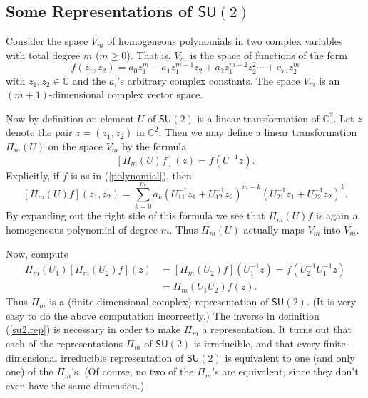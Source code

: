 \documentclass{amsbook}
\theoremstyle{plain}
\numberwithin{equation}{chapter}
\numberwithin{theorem}{chapter}
\begin{document}
\subsection{Some Representations of $\mathsf{SU}(2)$}

Consider the space $V_{m}$ of homogeneous polynomials in two complex variables
with total degree $m$ ($m\geq0$). That is, $V_{m}$ is the space of functions
of the form
\begin{equation}
f(z_{1},z_{2})=a_{0}z_{1}^{m}+a_{1}z_{1}^{m-1}z_{2}+a_{2}z_{1}^{m-2}z_{2}%
^{2}\cdots+a_{m}z_{2}^{m}\label{polynomial}%
\end{equation}
with $z_{1},z_{2}\in\mathbb{C}$ and the $a_{i}$'s arbitrary complex constants.
The space $V_{m}$ is an $(m+1)$-dimensional complex vector space.

Now by definition an element $U$ of $\mathsf{SU}(2)$ is a linear
transformation of $\mathbb{C}^{2}$. Let $z$ denote the pair $z=(z_{1},z_{2})$
in $\mathbb{C}^{2}$. Then we may define a linear transformation $\Pi_{m}(U)$
on the space $V_{m}$ by the formula
\begin{equation}
\left[  \Pi_{m}(U)f\right]  (z)=f(U^{-1}z)\text{.}\label{su2.rep}%
\end{equation}
Explicitly, if $f$ is as in (\ref{polynomial}), then
\[
\left[  \Pi_{m}(U)f\right]  (z_{1},z_{2})=\sum_{k=0}^{m}a_{k}\left(
U_{11}^{-1}z_{1}+U_{12}^{-1}z_{2}\right)  ^{m-k}\left(  U_{21}^{-1}%
z_{1}+U_{22}^{-1}z_{2}\right)  ^{k}\text{.}%
\]
By expanding out the right side of this formula we see that $\Pi_{m}(U)f$ is
again a homogeneous polynomial of degree $m$. Thus $\Pi_{m}(U)$ actually maps
$V_{m}$ into $V_{m}$.

Now, compute
\begin{align*}
\Pi_{m}\left(  U_{1}\right)  \left[  \Pi_{m}\left(  U_{2}\right)  f\right]
(z)  & =\left[  \Pi_{m}\left(  U_{2}\right)  f\right]  (U_{1}^{-1}z)=f\left(
U_{2}^{-1}U_{1}^{-1}z\right) \\
& =\Pi_{m}\left(  U_{1}U_{2}\right)  f(z)\text{.}%
\end{align*}
Thus $\Pi_{m}$ is a (finite-dimensional complex) representation of
$\mathsf{SU}(2)$. (It is very easy to do the above computation incorrectly.)
The inverse in definition (\ref{su2.rep}) is necessary in order to make
$\Pi_{m}$ a representation. It turns out that each of the representations
$\Pi_{m}$ of $\mathsf{SU}(2)$ is irreducible, and that every
finite-dimensional irreducible representation of $\mathsf{SU}(2)$ is
equivalent to one (and only one) of the $\Pi_{m}$'s. (Of course, no two of the
$\Pi_{m}$'s are equivalent, since they don't even have the same dimension.)
\end{document}
